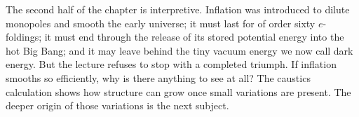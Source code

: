 The second half of the chapter is interpretive. Inflation was introduced to dilute monopoles and smooth the early universe; it must last for of order sixty \(e\)-foldings; it must end through the release of its stored potential energy into the hot Big Bang; and it may leave behind the tiny vacuum energy we now call dark energy. But the lecture refuses to stop with a completed triumph. If inflation smooths so efficiently, why is there anything to see at all? The caustics calculation shows how structure can grow once small variations are present. The deeper origin of those variations is the next subject.